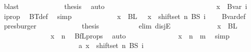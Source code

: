 \begin{isabellebody}
\ blast\isanewline
\ \ \ \ \ \ \ \ \ \isamarkupfalse%
\ \isamarkupfalse%
\ {\isacharquery}{\kern0pt}thesis\ \isamarkupfalse%
\ auto\isanewline
\ \ \ \ \ \ \ \isamarkupfalse%
\isanewline
\ \ \ \ \ \ \ \ \ \isamarkupfalse%
\ {}\isanewline
\ \ \ \ \ \ \ \ \ \isamarkupfalse%
\ \isamarkupfalse%
\ {\isachardoublequoteopen}x\ {\isasymin}\ Bvar\ i{\isachardoublequoteclose}\ \isamarkupfalse%
\ i{\isacharunderscore}{\kern0pt}prop\ \isamarkupfalse%
\ BT{\isacharunderscore}{\kern0pt}def\ \isamarkupfalse%
\ simp\isanewline
\ \ \ \ \ \ \ \ \ \isamarkupfalse%
\ \isamarkupfalse%
\ {\isachardoublequoteopen}x\ {\isasymin}\ BL\ {}\ {\isasymor}\ x\ {\isasymin}\ shiftset\ n\ {\isacharparenleft}{\kern0pt}BS\ {\isacharparenleft}{\kern0pt}i\ {\isacharminus}{\kern0pt}\ {}{\isacharparenright}{\kern0pt}{\isacharparenright}{\kern0pt}{\isachardoublequoteclose}\ \isamarkupfalse%
\ Bvar{\isacharunderscore}{\kern0pt}def\ \isamarkupfalse%
\ presburger\isanewline
\ \ \ \ \ \ \ \ \ \isamarkupfalse%
\ \isamarkupfalse%
\ {\isacharquery}{\kern0pt}thesis\isanewline
\ \ \ \ \ \ \ \ \ \isamarkupfalse%
\ {\isacharparenleft}{\kern0pt}elim\ disjE{\isacharparenright}{\kern0pt}\isanewline
\ \ \ \ \ \ \ \ \ \ \ \isamarkupfalse%
\ {\isachardoublequoteopen}x\ {\isasymin}\ BL\ {}{\isachardoublequoteclose}\isanewline
\ \ \ \ \ \ \ \ \ \ \ \isamarkupfalse%
\ \isamarkupfalse%
\ {\isachardoublequoteopen}x\ {\isasymin}\ {\isacharbraceleft}{\kern0pt}{\isachardot}{\kern0pt}{\isachardot}{\kern0pt}{\isacharless}{\kern0pt}n{\isacharbraceright}{\kern0pt}{\isachardoublequoteclose}\ \isamarkupfalse%
\ BfL{\isacharunderscore}{\kern0pt}props\ \isamarkupfalse%
\ auto\isanewline
\ \ \ \ \ \ \ \ \ \ \ \isamarkupfalse%
\ \isamarkupfalse%
\ {\isachardoublequoteopen}x\ {\isasymin}\ {\isacharbraceleft}{\kern0pt}{\isachardot}{\kern0pt}{\isachardot}{\kern0pt}{\isacharless}{\kern0pt}n\ {\isacharplus}{\kern0pt}\ m{\isacharbraceright}{\kern0pt}{\isachardoublequoteclose}\ \isamarkupfalse%
\ simp\isanewline
\ \ \ \ \ \ \ \ \ \isamarkupfalse%
\isanewline
\ \ \ \ \ \ \ \ \ \ \ \isamarkupfalse%
\ a{\isacharcolon}{\kern0pt}\ {\isachardoublequoteopen}x\ {\isasymin}\ shiftset\ n\ {\isacharparenleft}{\kern0pt}BS\ {\isacharparenleft}{\kern0pt}i\ {\isacharminus}{\kern0pt}\ {}{\isacharparenright}{\kern0pt}{\isacharparenright}{\kern0pt}{\isachardoublequoteclose}\isanewline

\end{isabellebody}

